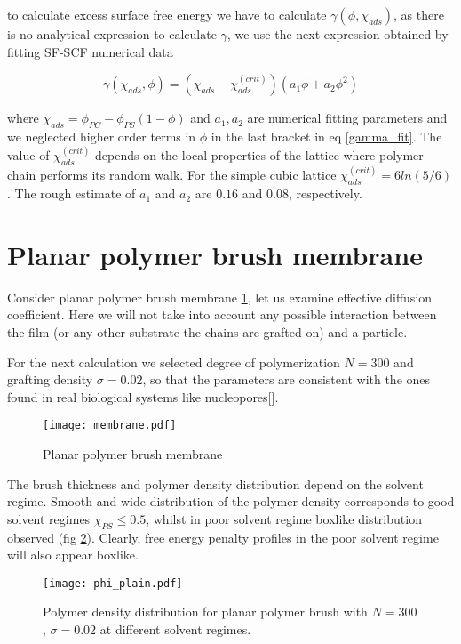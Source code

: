 \documentclass[12pt,a4paper]{article}
\begin{document}
to calculate excess surface free energy we have to calculate $\gamma(\phi, \chi_{ads})$, as there is no analytical expression to calculate $\gamma$, we use the next expression obtained by fitting SF-SCF numerical data

\begin{equation}
    \gamma(\chi_{ads}, \phi)=(\chi_{ads}-\chi_{ads}^{(crit)})(a_1\phi+a_2\phi^{2})
    \label{gamma_fit}
\end{equation}
    
where $\chi_{ads}=\phi_{PC}-\phi_{PS}(1-\phi)$ and $a_1,a_2$ are numerical fitting parameters and we neglected higher order terms in $\phi$ in the last bracket in eq \ref{gamma_fit}. The value of $\chi_{ads}^{(crit)}$ depends on the local properties of the lattice where polymer chain performs its random walk. For the simple cubic lattice $\chi_{ads}^{(crit)}=6ln(5/6)$.
The rough estimate of $a_1$ and $a_2$ are $0.16$ and $0.08$, respectively.

\section{Planar polymer brush membrane}

Consider planar polymer brush membrane \ref{fig:membrane}, let us examine effective diffusion coefficient. Here we will not take into account any possible interaction between the film (or any other substrate the chains are grafted on) and a particle. 

For the next calculation we selected degree of polymerization $N=300$ and grafting density $\sigma = 0.02$, so that the parameters are consistent with the ones found in real biological systems like nucleopores[].

\begin{figure}
    \center
    \texttt{[image: membrane.pdf]}
    \caption{Planar polymer brush membrane}
    \label{fig:membrane}
\end{figure}

The brush thickness and polymer density distribution depend on the solvent regime. Smooth and wide distribution of the polymer density corresponds to good solvent regimes $\chi_{PS} \leq 0.5$, whilst in poor solvent regime boxlike distribution observed (fig \ref{fig:phi_planar}). Clearly, free energy penalty profiles in the poor solvent regime will also appear boxlike.

\begin{figure}
    \center
    \texttt{[image: phi\_plain.pdf]}
    \caption{Polymer density distribution for planar polymer brush with $N=300$, $\sigma = 0.02$ at different solvent regimes.}
    \label{fig:phi_planar}
\end{figure}
\end{document}
